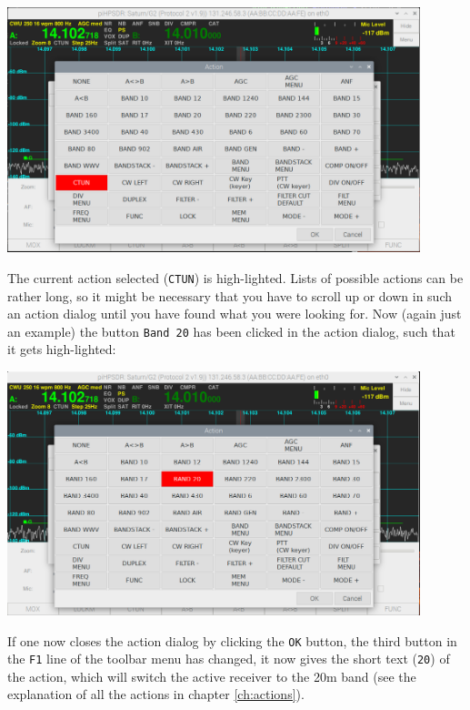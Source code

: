 \documentclass[12pt]{book}
\begin{document}
\begin{center}
\includegraphics[width=12cm]{ToolbarMenu2.png}
\end{center}

The current action selected (\texttt{CTUN}) is high-lighted. Lists of possible actions can be rather long,
so it might be necessary that you have to scroll up or down in such an action dialog until you have
found what you were looking for. Now (again just an example) the button \texttt{Band 20} has been clicked
in the action dialog, such that it gets high-lighted:

\begin{center}
\includegraphics[width=12cm]{ToolbarMenu3.png}
\end{center}

If one now closes the action dialog by clicking the \texttt{OK} button, the third button in the \texttt{F1}
line of the toolbar menu has changed, it now gives the short text (\texttt{20}) of the action, which will
switch the active receiver to the 20m band (see the explanation of all the actions in chapter \ref{ch:actions}).
\end{document}
